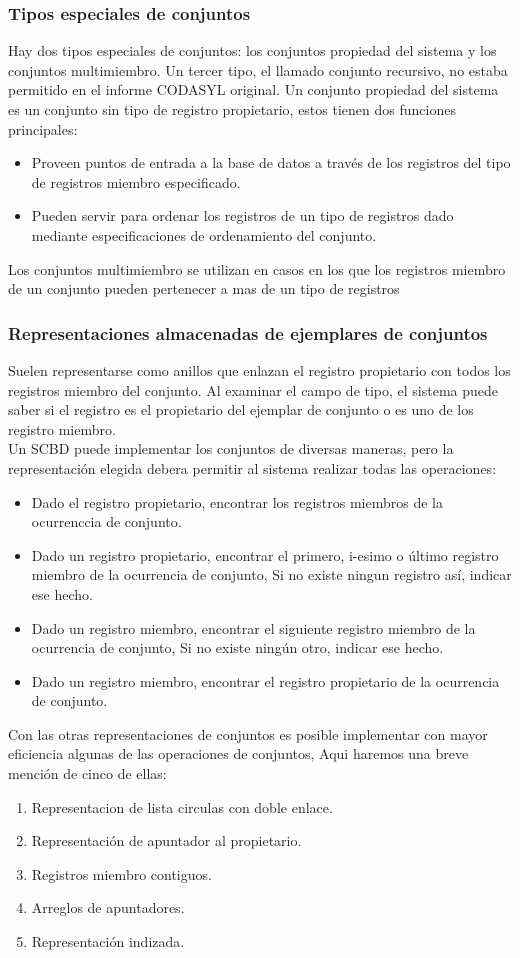 \documentclass[12pts, A3 ,twosides]{article}
\begin{document}
\subsubsection{Tipos especiales de conjuntos}
Hay dos tipos especiales de conjuntos: los conjuntos propiedad del sistema y los conjuntos multimiembro. Un tercer tipo, el llamado conjunto recursivo, no estaba permitido en el informe CODASYL original. Un conjunto propiedad del sistema es un conjunto sin tipo de registro propietario, estos tienen dos funciones principales:
\begin{itemize}
\item[] Proveen puntos de entrada a la base de datos a través de los registros del tipo de registros miembro especificado.
\item[] Pueden servir para ordenar los registros de un tipo de registros dado mediante especificaciones de ordenamiento del conjunto. 
\end{itemize}
Los conjuntos multimiembro se utilizan en casos en los que los registros miembro de un conjunto pueden pertenecer a mas de un tipo de registros

\subsubsection{Representaciones almacenadas de ejemplares de conjuntos}
Suelen representarse como anillos que enlazan el registro propietario con todos los registros miembro del conjunto. Al examinar el campo de tipo, el sistema puede saber si el registro es el propietario del ejemplar de conjunto o es uno de los registro miembro.\\
Un SCBD puede implementar los conjuntos de diversas maneras, pero la representación elegida debera permitir al sistema realizar todas las operaciones:
\begin{itemize}
\item Dado el registro propietario, encontrar los registros miembros de la ocurrenccia de conjunto.
\item Dado un registro propietario, encontrar el primero, i-esimo o último registro miembro de la ocurrencia de conjunto, Si no existe ningun registro así, indicar ese hecho.
\item Dado un registro miembro, encontrar el siguiente registro miembro de la ocurrencia de conjunto, Si no existe ningún otro, indicar ese hecho.
\item Dado un registro miembro, encontrar el registro propietario de la ocurrencia de conjunto.
\end{itemize}
Con las otras representaciones de conjuntos es posible implementar con mayor eficiencia algunas de las operaciones de conjuntos, Aqui haremos una breve mención de cinco de ellas:
\begin{enumerate}
\item Representacion de lista circulas con doble enlace.
\item Representación de apuntador al propietario.
\item Registros miembro contiguos.
\item Arreglos de apuntadores.
\item Representación indizada.
\end{enumerate}
\end{document}
